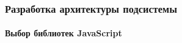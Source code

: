 \clearpage
\subsubsection{Разработка архитектуры подсистемы} \hfill
\paragraph{Выбор библиотек JavaScript}